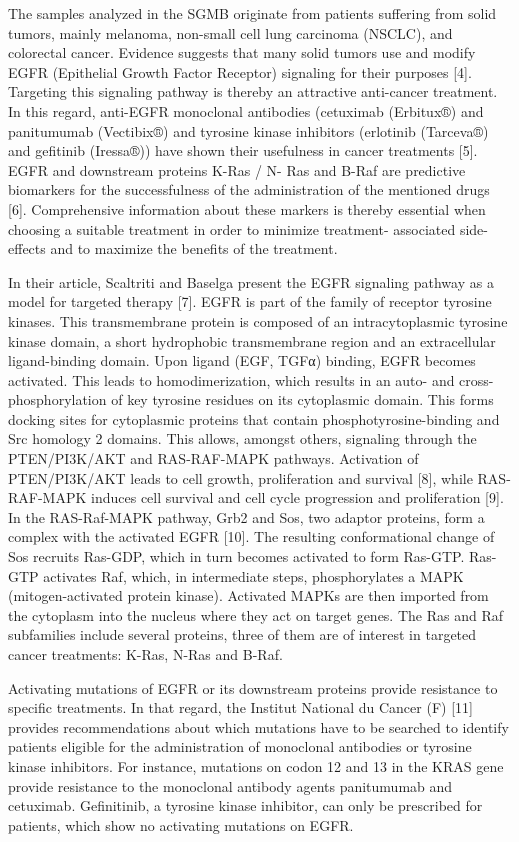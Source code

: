 The samples analyzed in the SGMB originate from patients suffering from solid tumors, mainly melanoma, non-small cell lung carcinoma (NSCLC), and colorectal cancer. Evidence suggests that many solid tumors use and modify EGFR (Epithelial Growth Factor Receptor) signaling for their purposes [4]. Targeting this signaling pathway is thereby an attractive anti-cancer treatment. In this regard, anti-EGFR monoclonal antibodies (cetuximab (Erbitux®) and panitumumab (Vectibix®) and tyrosine kinase inhibitors (erlotinib (Tarceva®) and gefitinib (Iressa®)) have shown their usefulness in cancer treatments [5]. EGFR and downstream proteins K-Ras / N- Ras and B-Raf are predictive biomarkers for the successfulness of the administration of the mentioned drugs [6]. Comprehensive information about these markers is thereby essential when choosing a suitable treatment in order to minimize treatment- associated side-effects and to maximize the benefits of the treatment.

In their article, Scaltriti and Baselga present the EGFR signaling pathway as a model for targeted therapy [7]. EGFR is part of the family of receptor tyrosine kinases. This transmembrane protein is composed of an intracytoplasmic tyrosine kinase domain, a short hydrophobic transmembrane region and an extracellular ligand-binding domain. Upon ligand (EGF, TGFα) binding, EGFR becomes activated. This leads to homodimerization, which results in an auto- and cross-phosphorylation of key tyrosine residues on its cytoplasmic domain. This forms docking sites for cytoplasmic proteins that contain phosphotyrosine-binding and Src homology 2 domains. This allows, amongst others, signaling through the PTEN/PI3K/AKT and RAS-RAF-MAPK pathways. Activation of PTEN/PI3K/AKT leads to cell growth, proliferation and survival [8], while RAS-RAF-MAPK induces cell survival and cell cycle progression and proliferation [9]. In the RAS-Raf-MAPK pathway, Grb2 and Sos, two adaptor proteins, form a complex with the activated EGFR [10]. The resulting conformational change of Sos recruits Ras-GDP, which in turn becomes activated to form Ras-GTP. Ras-GTP activates Raf, which, in intermediate steps, phosphorylates a MAPK (mitogen-activated protein kinase). Activated MAPKs are then imported from the cytoplasm into the nucleus where they act on target genes. The Ras and Raf subfamilies include several proteins, three of them are of interest in targeted cancer treatments: K-Ras, N-Ras and B-Raf.

Activating mutations of EGFR or its downstream proteins provide resistance to specific treatments. In that regard, the Institut National du Cancer (F) [11] provides recommendations about which mutations have to be searched to identify patients eligible for the administration of monoclonal antibodies or tyrosine kinase inhibitors. For instance, mutations on codon 12 and 13 in the KRAS gene provide resistance to the monoclonal antibody agents panitumumab and cetuximab. Gefinitinib, a tyrosine kinase inhibitor, can only be prescribed for patients, which show no activating mutations on EGFR.

